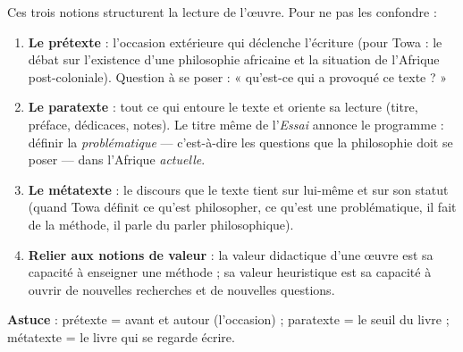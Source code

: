 \documentclass[11pt]{article}
\newcommand{\cle}[1]{{\popxbold\color{popdark}#1}}
\begin{document}
\begin{methode}
Ces trois notions structurent la lecture de l'œuvre. Pour ne pas les confondre :
\begin{enumerate}
\item \textbf{Le prétexte} : l'occasion extérieure qui déclenche l'écriture (pour Towa : le débat sur l'existence d'une philosophie africaine et la situation de l'Afrique post-coloniale). Question à se poser : « qu'est-ce qui a provoqué ce texte ? »
\item \textbf{Le paratexte} : tout ce qui entoure le texte et oriente sa lecture (titre, préface, dédicaces, notes). Le titre même de l'\emph{Essai} annonce le programme : définir la \emph{problématique} — c'est-à-dire les questions que la philosophie doit se poser — dans l'Afrique \emph{actuelle}.
\item \textbf{Le métatexte} : le discours que le texte tient sur lui-même et sur son statut (quand Towa définit ce qu'est philosopher, ce qu'est une problématique, il fait de la méthode, il parle du parler philosophique).
\item \textbf{Relier aux notions de valeur} : la \cle{valeur didactique} d'une œuvre est sa capacité à enseigner une méthode ; sa \cle{valeur heuristique} est sa capacité à ouvrir de nouvelles recherches et de nouvelles questions.
\end{enumerate}
\textbf{Astuce} : prétexte = avant et autour (l'occasion) ; paratexte = le seuil du livre ; métatexte = le livre qui se regarde écrire.
\end{methode}
\end{document}
